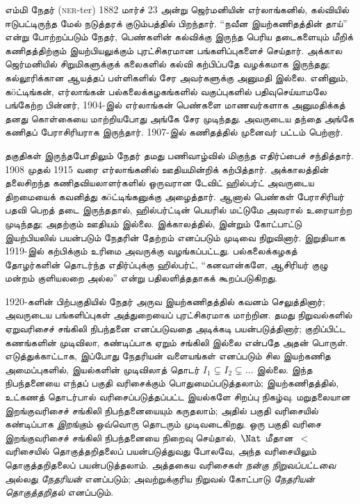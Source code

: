 \documentclass[../../../include/open-logic-section]{subfiles}
\begin{document}



எம்மி நேதர் (\textsc{ner}-ter) 1882 மார்ச் 23 அன்று ஜெர்மனியின்
எர்லாங்கனில், கல்வியில் ஈடுபட்டிருந்த மேல் நடுத்தரக் குடும்பத்தில்
பிறந்தார். ``நவீன இயற்கணிதத்தின் தாய்'' என்று போற்றப்படும் நேதர்,
பெண்களின் கல்விக்கு இருந்த பெரிய தடைகளையும் மீறிக் கணிதத்திற்கும்
இயற்பியலுக்கும் புரட்சிகரமான பங்களிப்புகளைச் செய்தார். அக்கால
ஜெர்மனியில் சிறுமிகளுக்குக் கலைகளில் கல்வி கற்பிப்பதே வழக்கமாக இருந்தது;
கல்லூரிக்கான ஆயத்தப் பள்ளிகளில் சேர அவர்களுக்கு அனுமதி இல்லை. எனினும்,
க\"{o}ட்டிங்கன், எர்லாங்கன் பல்கலைக்கழகங்களில் வகுப்புகளில்
பதிவுசெய்யாமலே பங்கேற்ற பின்னர், 1904-இல் எர்லாங்கன் பெண்களை மாணவர்களாக
அனுமதிக்கத் தனது கொள்கையை மாற்றியபோது அங்கே சேர முடிந்தது. அவருடைய
தந்தை அங்கே கணிதப் பேராசிரியராக இருந்தார். 1907-இல் கணிதத்தில்
முனைவர் பட்டம் பெற்றார்.

தகுதிகள் இருந்தபோதிலும் நேதர் தமது பணிவாழ்வில் மிகுந்த எதிர்ப்பைச்
சந்தித்தார். 1908 முதல் 1915 வரை எர்லாங்கனில் ஊதியமின்றிக் கற்பித்தார்.
அக்காலத்தின் தலைசிறந்த கணிதவியலாளர்களில் ஒருவரான டேவிட் ஹில்பர்ட்
அவருடைய திறமையைக் கவனித்து க\"{o}ட்டிங்கனுக்கு அழைத்தார். ஆனால் பெண்கள்
பேராசிரியர் பதவி பெறத் தடை இருந்ததால், ஹில்பர்ட்டின் பெயரில் மட்டுமே
அவரால் உரையாற்ற முடிந்தது; அதற்கும் ஊதியம் இல்லை. இக்காலத்தில்,
இன்றும் கோட்பாட்டு இயற்பியலில் பயன்படும் நேதரின் தேற்றம் எனப்படும்
முடிவை நிறுவினார். இறுதியாக 1919-இல் கற்பிக்கும் உரிமை அவருக்கு
வழங்கப்பட்டது. பல்கலைக்கழகத் தோழர்களின் தொடர்ந்த எதிர்ப்புக்கு
ஹில்பர்ட், ``கனவான்களே, ஆசிரியர் குழு மன்றம் குளியலறை அல்ல'' என்று
பதிலளித்ததாகக் கூறப்படுகிறது.

1920-களின் பிற்பகுதியில் நேதர் அருவ இயற்கணிதத்தில் கவனம் செலுத்தினார்;
அவருடைய பங்களிப்புகள் அத்துறையைப் புரட்சிகரமாக மாற்றின. தமது
நிறுவல்களில் ஏறுவரிசைச் சங்கிலி நிபந்தனை எனப்படுவதை அடிக்கடி
பயன்படுத்தினார்; குறிப்பிட்ட கணங்களின் முடிவிலா, கண்டிப்பாக ஏறும்
சங்கிலி இல்லை என்பதே அதன் பொருள். எடுத்துக்காட்டாக, இப்போது
நேதரியன் வளையங்கள் எனப்படும் சில இயற்கணித அமைப்புகளில்,
இயல்களின் முடிவிலாத் தொடர் $I_1
\subsetneq I_2 \subsetneq \dots$ இல்லை. இந்த நிபந்தனையை எந்தப்
பகுதி வரிசைக்கும் பொதுமைப்படுத்தலாம்; இயற்கணிதத்தில், உட்கணத்
தொடர்பால் வரிசைப்படுத்தப்பட்ட இயல்களே சிறப்பு நிகழ்வு. மறுதலையான
இறங்குவரிசைச் சங்கிலி நிபந்தனையையும் கருதலாம்; அதில் பகுதி வரிசையில்
கண்டிப்பாக \emph{இறங்கு}ம் ஒவ்வொரு தொடரும் முடிவடைகிறது. ஒரு பகுதி
வரிசை இறங்குவரிசைச் சங்கிலி நிபந்தனையை நிறைவு செய்தால்,~$\Nat$ மீதான~$<$
வரிசையில் தொகுத்தறிதலைப் பயன்படுத்துவது போலவே, அந்த வரிசையிலும்
தொகுத்தறிதலைப் பயன்படுத்தலாம். அத்தகைய வரிசைகள்
\emph{நன்கு நிறுவப்பட்டவை} அல்லது \emph{நேதரியன்} எனப்படும்;
அவற்றுக்குரிய நிறுவல் கோட்பாடு \emph{நேதரியன் தொகுத்தறிதல்} எனப்படும்.
\end{document}
